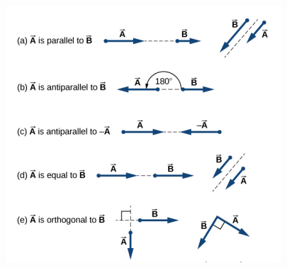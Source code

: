 \documentclass[12pt,addpoints]{exam}
\begin{document}
    \begin{center}
    	\includegraphics[scale=0.6]{vectors.png}
    \end{center}
\end{document}
